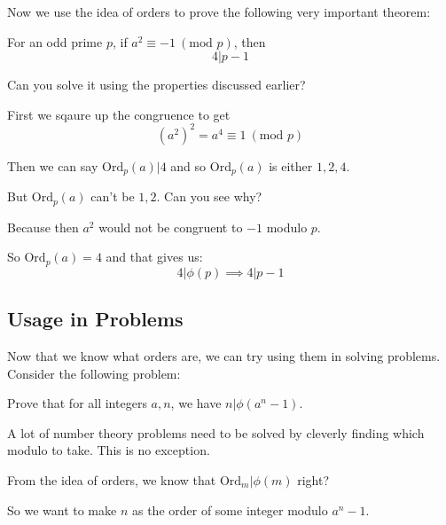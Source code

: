 \documentclass[compress]{beamer}
\newcommand{\gap}{\pause\vspace{1em}}
\begin{document}
\begin{frame}
    Now we use the idea of orders to prove the following very important
    theorem:

    \vspace{1em}

    \textcolor{NordRed}{For an odd prime $p$, if $a^2 \equiv -1 \ (\text{mod }
        p)$, then 
    \[4|p-1\]}

    \gap

    Can you solve it using the properties discussed earlier?
\end{frame}

\begin{frame}
    First we sqaure up the congruence to get
    \textcolor{NordRed}{\[\left(a^2\right) ^2 = a^4 \equiv 1 \ (\text{mod } p)\] }

    \pause

    \textcolor{NordBrightBlue}{Then we can say $\text{Ord}_p(a) | 4$ and so
    $\text{Ord}_p(a)$ is either $1, 2, 4$.} 

    \gap 

    But $\text{Ord}_p(a)$ can't be $1, 2$. Can you see why?

    \gap

    Because then $a^2$ would not be congruent to $-1$ modulo $p$. 

    \gap

    So \textcolor{NordRed}{$\text{Ord}_p(a) = 4$} and that gives us:
    \[4|\phi(p) \implies 4|p-1\] 
\end{frame}

\subsection{Usage in Problems}

\begin{frame}
    Now that we know what orders are, we can try using them in solving
    problems. Consider the following problem:

    \gap

    \textcolor{NordOrange}{Prove that for all integers $a, n$, we have $n|\phi(a^n-1)$.}

    \gap

    A lot of number theory problems need to be solved by cleverly finding
    which modulo to take. This is no exception.

    \gap

    From the idea of orders, we know that $\text{Ord}_m | \phi\left(m\right) $
    right?

    \gap

    \textcolor{NordBrightBlue}{
        So we want to make $n$ as the order of some integer modulo $a^n-1$.
    }

\end{frame}
\end{document}
